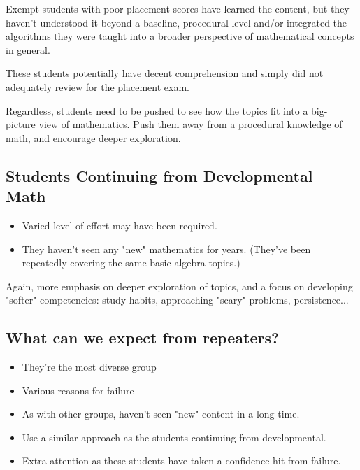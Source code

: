 \documentclass{ximera}
\begin{document}
\begin{theorem}
Exempt students with poor placement scores have learned the content, 
but they haven't understood it beyond a baseline, procedural level 
and/or integrated the algorithms they were taught into a broader perspective 
of mathematical concepts in general.
\end{theorem}

\begin{corollary}
These students potentially have decent comprehension and simply did not 
adequately review for the placement exam. \\
\end{corollary}

Regardless, students need to be pushed to see how the topics fit into a big-
picture view of mathematics. Push them away from a procedural knowledge of
math, and encourage deeper exploration.\\

\subsection{Students Continuing from Developmental Math}

\begin{itemize}
\item Varied level of effort may have been required. 
\item They haven't seen any "new" mathematics for years. (They've been repeatedly covering the same basic algebra
topics.)
\end{itemize}

Again, more emphasis on deeper exploration of topics, and a focus on developing
"softer" competencies: study habits, approaching "scary" problems, persistence...\\


\subsection{What can we expect from repeaters?}

\begin{itemize}
\item They're the most diverse group
\item Various reasons for failure
\item As with other groups, haven't seen "new" content in a long time.
\item Use a similar approach as the students continuing from developmental.
\item Extra attention as these students have taken a confidence-hit from failure.
\end{itemize}
\end{document}
